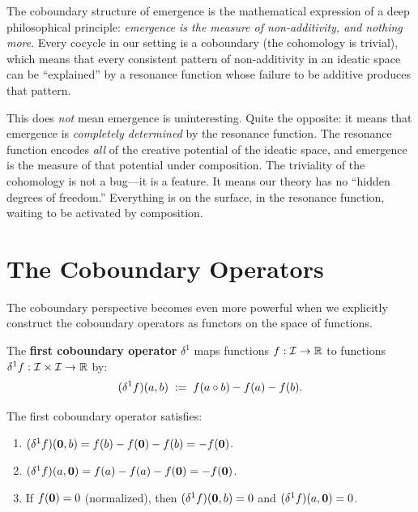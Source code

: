 \begin{interpretation}
The coboundary structure of emergence is the mathematical expression of a deep
philosophical principle: \emph{emergence is the measure of non-additivity, and
nothing more}. Every cocycle in our setting is a coboundary (the cohomology is
trivial), which means that every consistent pattern of non-additivity in an
ideatic space can be ``explained'' by a resonance function whose failure to be
additive produces that pattern.

This does \emph{not} mean emergence is uninteresting. Quite the opposite: it
means that emergence is \emph{completely determined} by the resonance function.
The resonance function encodes \emph{all} of the creative potential of the ideatic
space, and emergence is the measure of that potential under composition. The
triviality of the cohomology is not a bug---it is a feature. It means our theory
has no ``hidden degrees of freedom.'' Everything is on the surface, in the
resonance function, waiting to be activated by composition.
\end{interpretation}


\section{The Coboundary Operators}

The coboundary perspective becomes even more powerful when we explicitly construct
the coboundary operators as functors on the space of functions.

\begin{definition}
\label{def:coboundary1}
The \textbf{first coboundary operator} $\delta^1$ maps functions $f : \mathcal{I} \to \mathbb{R}$
to functions $\delta^1 f : \mathcal{I} \times \mathcal{I} \to \mathbb{R}$ by:
\[
  (\delta^1 f)(a,b) \;:=\; f(a \circ b) - f(a) - f(b).
\]
\end{definition}

\begin{theorem}
\label{thm:coboundary1-properties}
The first coboundary operator satisfies:
\begin{enumerate}
  \item $(\delta^1 f)(\mathbf{0}, b) = f(b) - f(\mathbf{0}) - f(b) = -f(\mathbf{0})$.
  \item $(\delta^1 f)(a, \mathbf{0}) = f(a) - f(a) - f(\mathbf{0}) = -f(\mathbf{0})$.
  \item If $f(\mathbf{0}) = 0$ (normalized), then $(\delta^1 f)(\mathbf{0}, b) = 0$
    and $(\delta^1 f)(a, \mathbf{0}) = 0$.
\end{enumerate}
\end{theorem}

